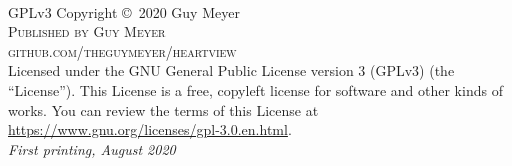 \documentclass[11pt,fleqn]{book} %
\begin{document}

\begingroup
\thispagestyle{empty} %
\vfill
\endgroup


\newpage
~\vfill
\thispagestyle{empty}

\setlength\parindent{0pt}

\noindent GPLv3 Copyright \copyright\ 2020 Guy Meyer\\ %

\noindent \textsc{Published by Guy Meyer}\\ %

\noindent \textsc{github.com/theguymeyer/heartview}\\ %

\noindent Licensed under the GNU General Public License version 3 (GPLv3) (the ``License''). This License is a free, copyleft license for software and other kinds of works. You can review the terms of this License at \url{https://www.gnu.org/licenses/gpl-3.0.en.html}. \\ %

\noindent \textit{First printing, August 2020} %

\end{document}
